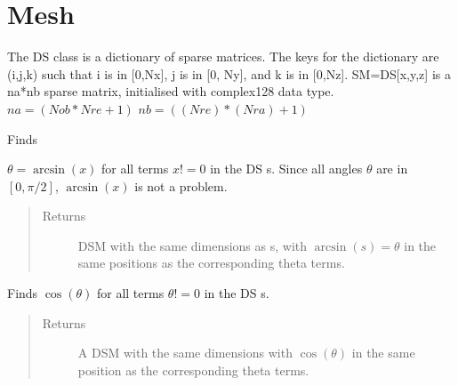 \documentclass[letterpaper,10pt,english]{sphinxmanual}
\begin{document}
\chapter{Mesh}
\label{index:module-DictionarySparseMatrix}\label{index:mesh}

\begin{fulllineitems}
\label{index:DictionarySparseMatrix.DS}
The DS class is a dictionary of sparse matrices.
The keys for the dictionary are (i,j,k) such that i is in {[}0,Nx{]},
j is in {[}0, Ny{]}, and k is in {[}0,Nz{]}.
SM=DS{[}x,y,z{]} is a na*nb sparse matrix, initialised with complex128 data type.
\(na=(Nob*Nre+1)\)
\(nb=((Nre)*(Nra)+1)\)

\begin{fulllineitems}
\label{index:DictionarySparseMatrix.DS.asin}
Finds

\(\theta=\arcsin(x)\) for all terms \(x != 0\) in     the DS s. Since all angles     \(\theta\) are in \([0,\pi /2]\),     \(\arcsin(x)\) is not a problem.
\begin{quote}\begin{description}
\item[{Returns}] \leavevmode
DSM with the same dimensions as s, with     \(\arcsin(s)=\theta\) in      the same positions as the corresponding theta terms.

\end{description}\end{quote}

\end{fulllineitems}


\begin{fulllineitems}
\label{index:DictionarySparseMatrix.DS.cos}
Finds \(\cos(\theta)\) for all terms     \(\theta != 0\) in the DS s.
\begin{quote}\begin{description}
\item[{Returns}] \leavevmode
A DSM with the same dimensions with     \(\cos(\theta)\) in the      same position as the corresponding theta terms.


\end{description}
\end{quote}
\end{fulllineitems}
\end{fulllineitems}
\end{document}
